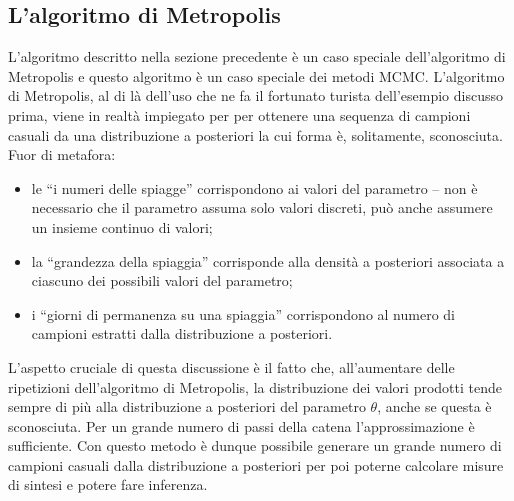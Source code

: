  
\subsection{L'algoritmo di Metropolis}
 
L'algoritmo descritto nella sezione precedente è un caso speciale dell'algoritmo di Metropolis e questo algoritmo è un caso speciale dei metodi MCMC.
L'algoritmo di Metropolis, al di là dell'uso che ne fa il fortunato turista dell'esempio discusso prima, viene in realtà impiegato per per ottenere una sequenza di campioni casuali da una distribuzione a posteriori la cui forma è, solitamente, sconosciuta.
Fuor di metafora:
\begin{itemize}
\item 
le \enquote{i numeri delle spiagge} corrispondono ai valori del parametro -- non è necessario che il parametro assuma solo valori discreti, può anche assumere un insieme continuo di valori;
\item 
la \enquote{grandezza della spiaggia} corrisponde alla densità a posteriori associata a ciascuno dei possibili valori del parametro;
\item
i \enquote{giorni di permanenza su una spiaggia} corrispondono al numero di campioni estratti dalla distribuzione a posteriori.
\end{itemize}

L'aspetto cruciale di questa discussione è il fatto che, all'aumentare delle ripetizioni dell'algoritmo di Metropolis, la distribuzione dei valori prodotti tende sempre di più alla distribuzione a posteriori del parametro $\theta$, anche se questa è sconosciuta.
Per un grande numero di passi della catena l'approssimazione è sufficiente.
Con questo metodo è dunque possibile generare un grande numero di campioni casuali dalla distribuzione a posteriori per poi poterne calcolare misure di sintesi e potere fare inferenza.

